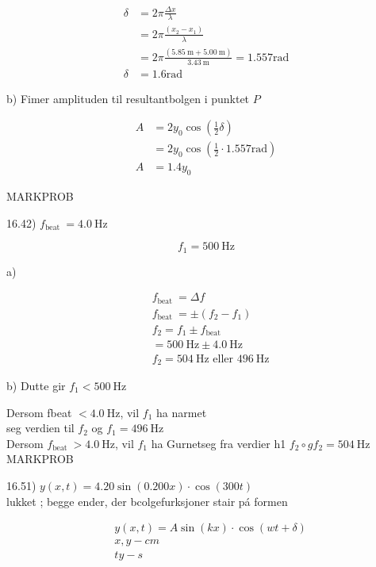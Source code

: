 \documentclass[10pt]{article}
\begin{document}
$$
\begin{aligned}
\delta & =2 \pi \frac{\Delta x}{\lambda} \\
& =2 \pi \frac{\left(x_{2}-x_{1}\right)}{\lambda} \\
& =2 \pi \frac{(5.85 \mathrm{~m}+5.00 \mathrm{~m})}{3.43 \mathrm{~m}}=1.557 \mathrm{rad} \\
\delta & =1.6 \mathrm{rad}
\end{aligned}
$$

b) Fimer amplituden til resultantbolgen i punktet $P$

$$
\begin{aligned}
A & =2 y_{0} \cos \left(\frac{1}{2} \delta\right) \\
& =2 y_{0} \cos \left(\frac{1}{2} \cdot 1.557 \mathrm{rad}\right) \\
A & =1.4 y_{0}
\end{aligned}
$$

MARKPROB

16.42) $f_{\text {beat }}=4.0 \mathrm{~Hz}$

$$
f_{1}=500 \mathrm{~Hz}
$$

a)

$$
\begin{aligned}
& f_{\text {beat }}=\Delta f \\
& f_{\text {beat }}= \pm\left(f_{2}-f_{1}\right) \\
& f_{2}=f_{1} \pm f_{\text {beat }} \\
& =500 \mathrm{~Hz} \pm 4.0 \mathrm{~Hz} \\
& f_{2}=504 \mathrm{~Hz} \text { eller } 496 \mathrm{~Hz}
\end{aligned}
$$

b) Dutte gir $f_{1}<500 \mathrm{~Hz}$

Dersom fbeat $<4.0 \mathrm{~Hz}$, vil $f_{1}$ ha narmet\\
seg verdien til $f_{2}$ og $f_{1}=496 \mathrm{~Hz}$\\
Dersom $f_{\text {beat }}>4.0 \mathrm{~Hz}$, vil $f_{1}$ ha Gurnetseg fra verdier h1 $f_{2} \circ g f_{2}=504 \mathrm{~Hz}$\\

MARKPROB

16.51) $y(x, t)=4.20 \sin (0.200 x) \cdot \cos (300 t)$\\
lukket ; begge ender, der bcolgefurksjoner stair pá formen

$$
\begin{aligned}
& y(x, t)=A \sin (k x) \cdot \cos (w t+\delta) \\
& x, y-c m \\
& t y-s
\end{aligned}
$$
\end{document}
